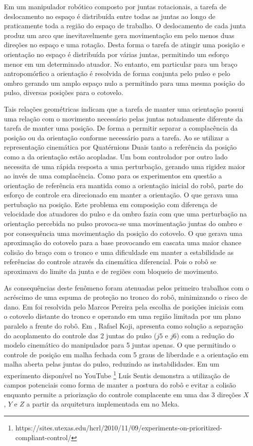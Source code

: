 Em um manipulador robótico composto por juntas rotacionais, a tarefa de deslocamento no espaço é distribuída entre todas as juntas ao longo de praticamente toda a região do espaço de trabalho. O deslocamento de cada junta produz um arco que inevitavelmente gera movimentação em pelo menos duas direções no espaço e uma rotação. Desta forma o tarefa de atingir uma posição e orientação no espaço é distribuída por várias juntas, permitindo um esforço menor em um determinado atuador. No entanto, em particular para um braço antropomórfico a orientação é resolvida de forma conjunta pelo pulso e pelo ombro gerando um amplo espaço nulo a permitindo para uma mesma posição do pulso, diversas posições para o cotovelo.

Tais relações geométricas indicam que a tarefa de manter uma orientação possui uma relação com o movimento necessário pelas juntas notadamente diferente da tarefa de manter uma posição. De forma a permitir separar a complacência da posição ou da orientação conforme necessário para a tarefa. Ao se utilizar a representação cinemática por Quatérnions Duais tanto a referência da posição como a da orientação estão acopladas. Um bom controlador por outro lado necessita de uma rápida resposta a uma perturbação, gerando uma rigidez maior ao invés de uma complacência. Como para os experimentos em questão a orientação de referência era mantida como a orientação inicial do robô, parte do esforço de controle era direcionado em manter a orientação. O que gerava uma pertubação na posição. Este problema em composição com diferença de velocidade dos atuadores do pulso e da ombro fazia com que uma perturbação na orientação percebida no pulso provoca-se uma movimentação juntas do ombro e por consequência uma movimentação da posição do cotovelo. O que gerava uma aproximação do cotovelo para a base provocando em cascata uma maior chance colisão do braço com o tronco e uma dificuldade em manter a estabilidade as referências do controle através da cinemática diferencial. Pois o robô se aproximava do limite da junta e de regiões com bloqueio de movimento.

As consequências deste fenômeno foram atenuadas pelos primeiro trabalhos com o acréscimo de uma espuma de proteção no tronco do robô, minimizando o risco de dano. Em \cite{marcosps2016} foi resolvida pelo Marcos Pereira pela escolha de posições iniciais com o cotovelo distante do tronco e operando em uma região limitada por um plano paralelo a frente do robô. Em \cite{koji2017}, Rafael Koji, apresenta como solução a separação do acoplamento do controle das 2 juntas do pulso ($j5$ e $j6$) com a redução do modelo cinemático do manipulador para 5 juntas apenas. O que permitindo o controle de posição em malha fechada com 5 graus de liberdade e a orientação em malha aberta pelas juntas do pulso, reduzindo as instabilidades. Em um experimento disponível no YouTube \footnote{https://sites.utexas.edu/hcrl/2010/11/09/experiments-on-prioritized-compliant-control/} Luís Sentis demonstra a utilização de campos potenciais como forma de manter a postura do robô e evitar a colisão enquanto permite a priorização do controle complacente em uma das 3 direções $X$, $Y$ e $Z$ a partir da arquitetura implementada em \cite{sentis2007synthesis} no Meka.

